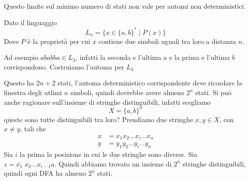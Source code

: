 \documentclass[12pt]{article}
\begin{document}
Questo limite sul minimo numero di stati non vale per automi non deterministici.
\begin{tcolorbox}
	Dato il linguaggio
	$$ L_n = \{ x \in \{a, b\}^* \mid P(x) \} $$
	Dove $P$ è la proprietà per cui $x$ contiene due simboli uguali tra loro a distanza $n$.

	Ad esempio $ababba \in L_3$, infatti la seconda e l'ultima $a$ e la prima e l'ultima $b$ corrispondono.
	Costruiamo l'automa per $L_3$
	\begin{center}
	\end{center}
	Questo ha $2n + 2$ stati, l'automa deterministico corrispondente deve ricordare la finestra degli utlimi $n$ simboli, quindi dovrebbe avere almeno $2^n$ stati.
	Si può anche ragionare sull'insieme di stringhe distinguibili, infatti scegliamo
	$$ X = \{a, b\}^n $$
	queste sono tutte distinguibili tra loro?
	Prendiamo due stringhe $x, y \in X$, con $ x \neq y $, tali che
	\begin{align*}
		x &= x_1 x_2 \dots x_i \dots x_n \\
		y &= y_1 y_2 \dots y_i \dots y_n 
	\end{align*}
	Sia $i$ la prima la posizione in cui le due stringhe sono diverse.
	Sia $z = \overline{x_1} \; \overline{x_2} \dots \overline{x_{i - 1}} a$.
	Quindi abbiamo trovato un insieme di $2^n$ stringhe distinguibili, quindi ogni DFA ha almeno $2^n$ stati.
\end{tcolorbox}
\end{document}
